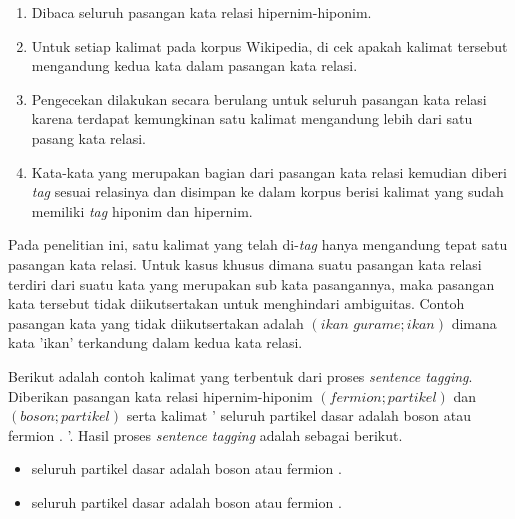 \begin{enumerate}
  \item Dibaca seluruh pasangan kata relasi hipernim-hiponim.
  \item Untuk setiap kalimat pada korpus Wikipedia, di cek apakah kalimat tersebut mengandung kedua kata dalam pasangan kata relasi.
  \item Pengecekan dilakukan secara berulang untuk seluruh pasangan kata relasi karena terdapat kemungkinan satu kalimat mengandung lebih dari satu pasang kata relasi.
  \item Kata-kata yang merupakan bagian dari pasangan kata relasi kemudian diberi \textit{tag} sesuai relasinya dan disimpan ke dalam korpus berisi kalimat yang sudah memiliki \textit{tag} hiponim dan hipernim.
\end{enumerate}

Pada penelitian ini, satu kalimat yang telah di-\textit{tag} hanya mengandung tepat satu pasangan kata relasi. Untuk kasus khusus dimana suatu pasangan kata relasi terdiri dari suatu kata yang merupakan sub kata pasangannya, maka pasangan kata tersebut tidak diikutsertakan untuk menghindari ambiguitas. Contoh pasangan kata yang tidak diikutsertakan adalah $(ikan\,\,gurame;ikan)$ dimana kata 'ikan' terkandung dalam kedua kata relasi.

Berikut adalah contoh kalimat yang terbentuk dari proses \textit{sentence tagging}. Diberikan pasangan kata relasi hipernim-hiponim $(fermion;partikel)$ dan $(boson;partikel)$ serta kalimat  '{\tagStart} seluruh partikel dasar adalah boson atau fermion . {\tagEnd}'. Hasil proses \textit{sentence tagging} adalah sebagai berikut.
\begin{itemize}
  \item {\tagStart} seluruh {\tagHypernym}partikel{\tagHypernym} dasar adalah boson atau {\tagHyponym}fermion{\tagHyponym} . {\tagEnd}
  \item {\tagStart} seluruh {\tagHypernym}partikel{\tagHypernym} dasar adalah {\tagHyponym}boson{\tagHyponym} atau fermion . {\tagEnd}
\end{itemize}
%
%

